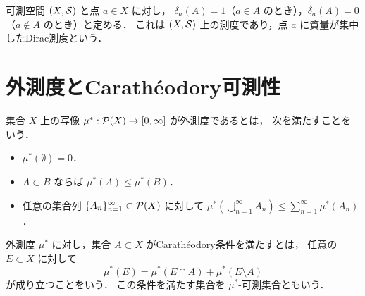 \begin{example}[Dirac測度]\label{ex:dirac-measure}
可測空間 $(X,\mathcal S)$ と点 $a\in X$ に対し，
$\delta_a(A)=1$（$a\in A$ のとき），$\delta_a(A)=0$（$a\notin A$ のとき）と定める．
これは $(X,\mathcal S)$ 上の測度であり，点 $a$ に質量が集中したDirac測度という．
\end{example}

\section{外測度とCarathéodory可測性}

\begin{definition}[外測度]\label{def:outer-measure}
集合 $X$ 上の写像 $\mu^*:\mathcal P(X)\to[0,\infty]$ が外測度であるとは，
次を満たすことをいう．
\begin{itemize}
    \item $\mu^*(\emptyset)=0$．
    \item $A\subset B$ ならば $\mu^*(A)\le\mu^*(B)$．
    \item 任意の集合列 $\{A_n\}_{n=1}^{\infty}\subset\mathcal P(X)$ に対して
    $\mu^*(\bigcup_{n=1}^{\infty}A_n)\le\sum_{n=1}^{\infty}\mu^*(A_n)$．
\end{itemize}
\end{definition}

\begin{definition}[Carathéodory条件]\label{def:caratheodory-condition}
外測度 $\mu^*$ に対し，集合 $A\subset X$ がCarathéodory条件を満たすとは，
任意の $E\subset X$ に対して
\[
\mu^*(E)=\mu^*(E\cap A)+\mu^*(E\setminus A)
\]
が成り立つことをいう．
この条件を満たす集合を $\mu^*$-可測集合ともいう．
\end{definition}


